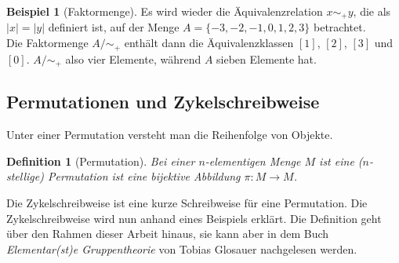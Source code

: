 \documentclass[12pt,a4paper, usenames, dvipsnames]{article}
\theoremstyle{mystyle}
\newtheorem{definition}{Definition}
\theoremstyle{definition}
\newtheorem{bsp}{Beispiel}[definition]
\begin{document}
\begin{bsp}[Faktormenge]

Es wird wieder die Äquivalenzrelation $x \sim_+ y$, die als $|x| =|y|$ definiert ist, auf der Menge $A=\{ -3, -2, -1, 0, 1, 2, 3 \}$ betrachtet.  \\
Die Faktormenge $A / \sim_+$ enthält dann die Äquivalenzklassen $[1]$, $[2]$, $[3]$ und $[0]$. $A / \sim_+$ also vier Elemente, während $A$ sieben Elemente hat.

\end{bsp}



%
%
%
%
%
%
%
%
%
%
%
%
%
\subsection{Permutationen und Zykelschreibweise} 
 \label{Abschnitt_PermutationZykel}

Unter einer Permutation versteht man die Reihenfolge von Objekte.

\begin{definition}[Permutation]
Bei einer $n$-elementigen Menge $M$ ist eine ($n$-stellige) Permutation ist eine bijektive Abbildung $\pi  : M \rightarrow M$.
\end{definition}
Die Zykelschreibweise ist eine kurze Schreibweise für eine Permutation.
Die Zykelschreibweise wird nun anhand eines Beispiels erklärt. Die Definition geht über den Rahmen dieser Arbeit hinaus, sie kann aber in dem Buch \textit{Elementar(st)e Gruppentheorie} von Tobias Glosauer \cite{Buch} nachgelesen werden.
\end{document}

